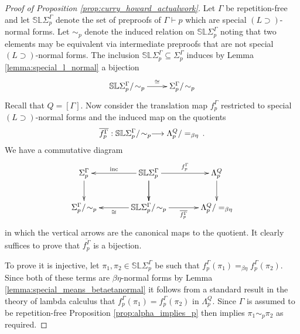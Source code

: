 \documentclass[english,letter paper,12pt,leqno]{article}
\theoremstyle{example}
\numberwithin{equation}{section}
\def\be{\begin{equation}}
\def\ee{\end{equation}}
\def\imp{\supset}
\begin{document}
\begin{proof}[Proof of Proposition \ref{prop:curry_howard_actualwork}] Let $\Gamma$ be repetition-free and let $\mathbb{SL}\Sigma^\Gamma_p$ denote the set of preproofs of $\Gamma \vdash p$ which are special $(L \imp)$-normal forms. Let $\sim_p$ denote the induced relation on $\mathbb{SL}\Sigma^\Gamma_p$ noting that two elements may be equivalent via intermediate preproofs that are not special $(L\imp)$-normal forms. The inclusion $\mathbb{SL}\Sigma^\Gamma_p \subseteq \Sigma^\Gamma_p$ induces by Lemma \ref{lemma:special_l_normal} a bijection
\be
\xymatrix{
\mathbb{SL}\Sigma^\Gamma_p/\!\sim_p \ar[r]^-{\cong} & \Sigma^\Gamma_p/\!\sim_p
}
\ee
Recall that $Q = [\Gamma]$. Now consider the translation map $f^\Gamma_p$ restricted to special $(L \imp)$-normal forms and the induced map on the quotients
\[
\overline{f^\Gamma_p}: \mathbb{SL}\Sigma^\Gamma_p/\!\sim_p \longrightarrow \Lambda^Q_p/=_{\beta\eta}\,.
\]
We have a commutative diagram 
\be
\xymatrix@C+1pc{
\Sigma^\Gamma_p\ar[d] & \mathbb{SL}\Sigma^\Gamma_p\ar[d] \ar@{->}[l]_-{\operatorname{inc}}\ar[r]^-{f^\Gamma_p}\ar[d] & \Lambda^Q_p \ar[d]\\
\Sigma^\Gamma_p/\!\sim_p & \mathbb{SL}\Sigma^\Gamma_p/\!\sim_p \ar[l]^-{\cong}\ar[r]_-{\overline{f^\Gamma_p}} & \Lambda^Q_p / =_{\beta \eta}
}
\ee
in which the vertical arrows are the canonical maps to the quotient. It clearly suffices to prove that $\overline{f^\Gamma_p}$ is a bijection.

To prove it is injective, let $\pi_1,\pi_2 \in \mathbb{SL}\Sigma^\Gamma_p$ be such that $f^\Gamma_p(\pi_1) =_{\beta \eta} f^\Gamma_p(\pi_2)$. Since both of these terms are $\beta\eta$-normal forms by Lemma \ref{lemma:special_means_betaetanormal} it follows from a standard result in the theory of lambda calculus \cite[Corollary 4.3]{selinger} that $f^\Gamma_p(\pi_1) = f^\Gamma_p(\pi_2)$ in $\Lambda^Q_p$. Since $\Gamma$ is assumed to be repetition-free Proposition \ref{prop:alpha_implies_p} then implies $\pi_1 \sim_p \pi_2$ as required.


\end{proof}
\end{document}
